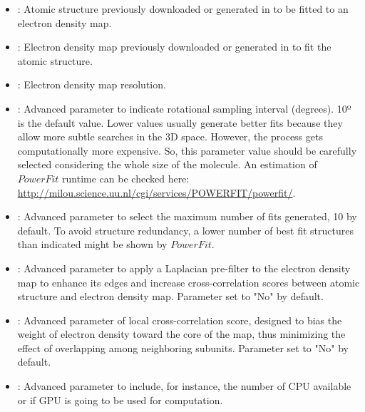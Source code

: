 \begin{itemize}
    \begin{itemize}
     \item {}: Atomic structure previously downloaded or generated in \scipion to be fitted to an electron density map.\\
     \item {}: Electron density map previously downloaded or generated in \scipion to fit the atomic structure.\\ %
     \item {}: Electron density map resolution.\\
     \item {}: Advanced parameter to indicate rotational sampling interval (degrees). 10º is the default value. Lower values usually generate better fits because they allow more subtle searches in the 3D space. However, the process gets computationally more expensive. So, this parameter value should be carefully selected considering the whole size of the molecule. An estimation of $PowerFit$ runtime can be checked here: \url{http://milou.science.uu.nl/cgi/services/POWERFIT/powerfit/}.\\
     \item {}: Advanced parameter to select the maximum number of fits generated, 10 by default. To avoid structure redundancy, a lower number of best fit structures than indicated might be shown by $PowerFit$.\\
     \item {}: Advanced parameter to apply a Laplacian pre-filter to the electron density map to enhance its edges and increase cross-correlation scores between atomic structure and electron density map. Parameter set to "No" by default.\\
     \item {}: Advanced parameter of local cross-correlation score, designed to bias the weight of electron density toward the core of the map, thus minimizing the effect of overlapping among neighboring subunits. Parameter set to "No" by default.\\
     \item {}: Advanced parameter to include, for instance, the number of CPU available or if GPU is going to be used for computation.\\
    \end{itemize}


\end{itemize}

